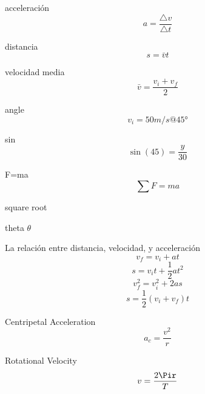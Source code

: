 
acceleración
\[ a=\frac{\triangle{v}}{\triangle{t}} \]

distancia
\[ s=\bar{v}t \]

velocidad media
\[ \bar{v} = \frac{v_i+v_f}{2} \]

angle
\[ v_i=50m/s @ \ang{45} \]

sin
\[ \sin(45)=\frac{y}{30} \]

F=ma
\[ \sum F=ma \]

square root
\sqrt{}

theta
$\theta$

La relación entre distancia, velocidad, y acceleración
\[ v_f=v_i+at \]
\[ s=v_it+\frac{1}{2}at^2 \]
\[ v_f^2=v_i^2+2as \]
\[ s=\frac{1}{2}(v_i+v_f)t \]

Centripetal Acceleration
\[ a_c=\frac{v^2}{r} \]

Rotational Velocity
\[ v=\frac{2\Pir}{T} \]
